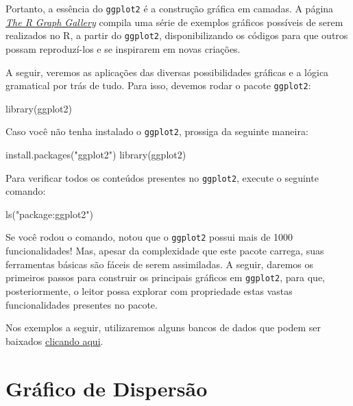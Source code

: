 \documentclass[
  brazilian,
]{book}
\newenvironment{Shaded}{\begin{snugshade}}{\end{snugshade}}
\newcommand{\FunctionTok}[1]{\textcolor[rgb]{0.00,0.00,0.00}{#1}}
\newcommand{\NormalTok}[1]{#1}
\newcommand{\StringTok}[1]{\textcolor[rgb]{0.31,0.60,0.02}{#1}}
\begin{document}
Portanto, a essência do \texttt{ggplot2} é a construção gráfica em camadas. A página \href{https://www.r-graph-gallery.com/}{\emph{The R Graph Gallery}} compila uma série de exemplos gráficos possíveis de serem realizados no R, a partir do \texttt{ggplot2}, disponibilizando os códigos para que outros possam reproduzí-los e se inspirarem em novas criações.

A seguir, veremos as aplicações das diversas possibilidades gráficas e a lógica gramatical por trás de tudo. Para isso, devemos rodar o pacote \texttt{ggplot2}:

\begin{Shaded}
\begin{Highlighting}[]
\FunctionTok{library}\NormalTok{(ggplot2)}
\end{Highlighting}
\end{Shaded}

Caso você não tenha instalado o \texttt{ggplot2}, prossiga da seguinte maneira:

\begin{Shaded}
\begin{Highlighting}[]
\FunctionTok{install.packages}\NormalTok{(}\StringTok{"ggplot2"}\NormalTok{)}
\FunctionTok{library}\NormalTok{(ggplot2)}
\end{Highlighting}
\end{Shaded}

Para verificar todos os conteúdos presentes no \texttt{ggplot2}, execute o seguinte comando:

\begin{Shaded}
\begin{Highlighting}[]
\FunctionTok{ls}\NormalTok{(}\StringTok{"package:ggplot2"}\NormalTok{)}
\end{Highlighting}
\end{Shaded}

Se você rodou o comando, notou que o \texttt{ggplot2} possui mais de 1000 funcionalidades! Mas, apesar da complexidade que este pacote carrega, suas ferramentas básicas são fáceis de serem assimiladas. A seguir, daremos os primeiros passos para construir os principais gráficos em \texttt{ggplot2}, para que, posteriormente, o leitor possa explorar com propriedade estas vastas funcionalidades presentes no pacote.

Nos exemplos a seguir, utilizaremos alguns bancos de dados que podem ser baixados \href{https://github.com/gustavojy/ApostilaCD-R/blob/main/dados_zip/dados_ggplot2.zip?raw=true}{clicando aqui}.

\hypertarget{gruxe1fico-de-dispersuxe3o}{%
\section{Gráfico de Dispersão}\label{gruxe1fico-de-dispersuxe3o}}
\end{document}
